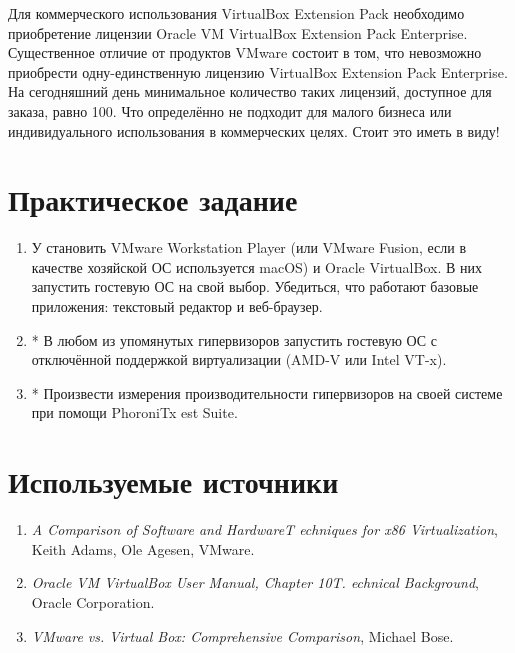 \documentclass[14pt, a4paper]{article}
\begin{document}
Для коммерческого использования VirtualBox Extension Pack необходимо приобретение лицензии
Oracle VM VirtualBox Extension Pack Enterprise. Существенное отличие от продуктов VMware состоит в
том, что невозможно приобрести одну-единственную лицензию VirtualBox Extension Pack Enterprise.
На сегодняшний день минимальное количество таких лицензий, доступное для заказа, равно 100. Что
определённо не подходит для малого бизнеса или индивидуального использования в коммерческих
целях. Стоит это иметь в виду!

\section*{Практическое задание}

\begin{enumerate}
    \item У становить VMware Workstation Player (или VMware Fusion, если в качестве хозяйской ОС
    используется macOS) и Oracle VirtualBox. В них запустить гостевую ОС на свой выбор.
    Убедиться, что работают базовые приложения: текстовый редактор и веб-браузер.
    \item * В любом из упомянутых гипервизоров запустить гостевую ОС с отключённой поддержкой
    виртуализации (AMD-V или Intel VT-x).
    \item * Произвести измерения производительности гипервизоров на своей системе при помощи
    PhoroniTx est Suite.
\end{enumerate}

\section*{Используемые источники}

\begin{enumerate}
    \item \textit{A Comparison of Software and HardwareT echniques for x86 Virtualization}, Keith Adams, Ole
    Agesen, VMware.
    \item \textit{Oracle VM VirtualBox User Manual, Chapter 10T. echnical Background}, Oracle Corporation.
    \item \textit{VMware vs. Virtual Box: Comprehensive Comparison}, Michael Bose.
\end{enumerate}
\end{document}
